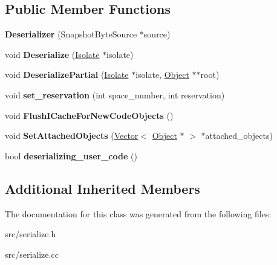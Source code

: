 \subsection*{Public Member Functions}
\begin{DoxyCompactItemize}
\item 
\hypertarget{classv8_1_1internal_1_1_deserializer_aa20ab49ca928c75053b89d40d49b2d2d}{}{\bfseries Deserializer} (Snapshot\+Byte\+Source $\ast$source)\label{classv8_1_1internal_1_1_deserializer_aa20ab49ca928c75053b89d40d49b2d2d}

\item 
\hypertarget{classv8_1_1internal_1_1_deserializer_a92f49a4e6c3ac1798069c2f3b1c49a1d}{}void {\bfseries Deserialize} (\hyperlink{classv8_1_1internal_1_1_isolate}{Isolate} $\ast$isolate)\label{classv8_1_1internal_1_1_deserializer_a92f49a4e6c3ac1798069c2f3b1c49a1d}

\item 
\hypertarget{classv8_1_1internal_1_1_deserializer_a8a8bdcf05a49d603241be744d049e0f6}{}void {\bfseries Deserialize\+Partial} (\hyperlink{classv8_1_1internal_1_1_isolate}{Isolate} $\ast$isolate, \hyperlink{classv8_1_1internal_1_1_object}{Object} $\ast$$\ast$root)\label{classv8_1_1internal_1_1_deserializer_a8a8bdcf05a49d603241be744d049e0f6}

\item 
\hypertarget{classv8_1_1internal_1_1_deserializer_ae967257a8f13d98d540e646af4fd9ec6}{}void {\bfseries set\+\_\+reservation} (int space\+\_\+number, int reservation)\label{classv8_1_1internal_1_1_deserializer_ae967257a8f13d98d540e646af4fd9ec6}

\item 
\hypertarget{classv8_1_1internal_1_1_deserializer_afd13530e71f5186f86ec04cc367cece1}{}void {\bfseries Flush\+I\+Cache\+For\+New\+Code\+Objects} ()\label{classv8_1_1internal_1_1_deserializer_afd13530e71f5186f86ec04cc367cece1}

\item 
\hypertarget{classv8_1_1internal_1_1_deserializer_aa3d2756063164d0c102a0d30c6b05631}{}void {\bfseries Set\+Attached\+Objects} (\hyperlink{classv8_1_1internal_1_1_vector}{Vector}$<$ \hyperlink{classv8_1_1internal_1_1_object}{Object} $\ast$ $>$ $\ast$attached\+\_\+objects)\label{classv8_1_1internal_1_1_deserializer_aa3d2756063164d0c102a0d30c6b05631}

\item 
\hypertarget{classv8_1_1internal_1_1_deserializer_aa457da1f0bedc45ec1d253aa5027f7a7}{}bool {\bfseries deserializing\+\_\+user\+\_\+code} ()\label{classv8_1_1internal_1_1_deserializer_aa457da1f0bedc45ec1d253aa5027f7a7}

\end{DoxyCompactItemize}
\subsection*{Additional Inherited Members}


The documentation for this class was generated from the following files\+:\begin{DoxyCompactItemize}
\item 
src/serialize.\+h\item 
src/serialize.\+cc\end{DoxyCompactItemize}
